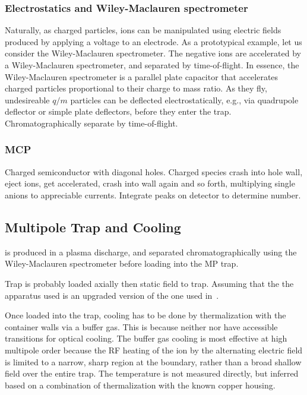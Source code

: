 \documentclass[12pt]{article}
\begin{document}
\subsubsection{Electrostatics and Wiley-Maclauren spectrometer}
Naturally, as charged particles, ions can be manipulated using electric fields produced by applying a voltage to an electrode. As a prototypical example, let us consider  the Wiley-Maclauren spectrometer. 
The negative ions are accelerated by a Wiley-Maclauren spectrometer, and separated by time-of-flight. In essence, the Wiley-Maclauren spectrometer is a parallel plate capacitor that accelerates charged particles proportional to their charge to mass ratio. As they fly, undesireable \( q/m \) particles can be deflected electrostatically, e.g., via quadrupole deflector or simple plate deflectors, before they enter the trap. Chromatographically separate by time-of-flight.

\subsubsection{MCP}
Charged semiconductor with diagonal holes. Charged species crash into hole wall, eject ions, get accelerated, crash into wall again and so forth, multiplying single anions to appreciable currents. Integrate peaks on detector to determine number.

\subsection{Multipole Trap and Cooling}
 is produced in a plasma discharge, and separated chromatographically using the Wiley-Maclauren spectrometer before loading into the MP trap.

Trap is probably loaded axially then static field to trap. Assuming that the the apparatus used is an upgraded version of the one used in~\cite{mikosch_evaporation_2008}.

Once loaded into the trap, cooling has to be done by thermalization with the container walls via a buffer gas. This is because neither  nor  have accessible transitions for optical cooling. The buffer gas cooling is most effective at high multipole order because the RF heating of the ion by the alternating electric field is limited to a narrow, sharp region at the boundary, rather than a broad shallow field over the entire trap. The temperature is not measured directly, but inferred based on a combination of thermalization with the known copper housing.
\end{document}
